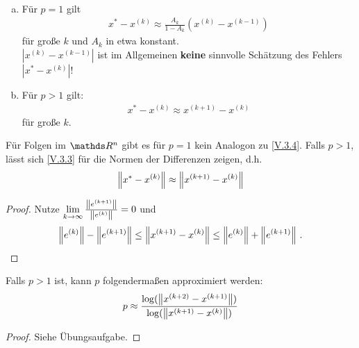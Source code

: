 \begin{Fole}~
  \begin{enumerate}[a)]
  \item Für $p=1$ gilt
    \begin{gather}
      x^{*}-x^{(k)} \approx \frac{A_k}{1-A_k}(x^{(k)}-x^{(k-1)})
      \label{V.3.4}
    \end{gather}
    für große $k$ und $A_k$ in etwa konstant. \\
    $|x^{(k)}-x^{(k-1)}|$ ist im Allgemeinen \textbf{keine} sinnvolle Schätzung
    des Fehlers $|x^{*}-x^{(k)}|$!
  \item Für $p>1$ gilt:
    \begin{gather}
      x^{*}-x^{(k)} \approx x^{(k+1)}-x^{(k)}
      \label{V.3.5}
    \end{gather}
    für große $k$.
  \end{enumerate}
\end{Fole}


\begin{Beme}
  Für Folgen im $\R^n$ gibt es für $p=1$ kein Analogon zu \eqref{V.3.4}.
  Falls $p>1$, lässt sich \eqref{V.3.3} für die Normen der Differenzen zeigen,
  d.h.
  \begin{gather}
    \nn[x^{*}-x^{(k)}] \approx \nn[x^{(k+1)}-x^{(k)}]
    \label{V.3.6}
  \end{gather}
  
  \begin{proof}
    Nutze $\lim\limits_{k\rightarrow\infty} \frac{\nn[e^{(k+1)}]}{\nn[e^{(k)}]} =0$
    und 
    \begin{gather*}
      \nn[e^{(k)}]-\nn[e^{(k+1)}]\leq \nn[x^{(k+1)}-x^{(k)}] \leq \nn[e^{(k)}]+\nn[e^{(k+1)}] \, .
    \end{gather*}
  \end{proof}
\end{Beme}


\begin{Fole}
  Falls $p>1$ ist, kann $p$ folgendermaßen approximiert werden:
  \begin{gather*}
    p \approx \frac{\log(\nn[x^{(k+2)}-x^{(k+1)}])}{\log(\nn[x^{(k+1)}-x^{(k)}])}
  \end{gather*}
\end{Fole}

\begin{proof}
  Siehe Übungsaufgabe.
\end{proof}

